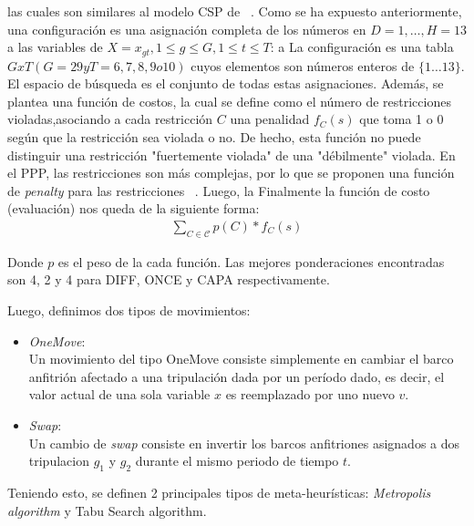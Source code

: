 \documentclass[letter, 10pt]{article}
\begin{document}
las cuales son similares al modelo CSP de ~\cite{Smith1996}. 
Como se ha expuesto anteriormente, una configuración es una asignación completa de los números en $D = {1,\ldots ,H = 13}$ a las variables de $X = {x_{gt}, 1 \leq g \leq G, 1 \leq t \leq T}$: a La configuración es una tabla $G x T (G = 29 y T = 6,7,8,9 o 10)$ cuyos elementos son números enteros de $\{1\ldots 13\}$. El espacio de búsqueda es el conjunto de todas estas asignaciones. Además, se plantea una función de costos, la cual se define como el número de restricciones violadas,asociando a cada restricción $C$ una penalidad $f_C (s)$ que toma 1 o 0 según que la restricción sea violada o no. De hecho, esta función no puede distinguir una restricción "fuertemente violada" de una "débilmente" violada. En el PPP, las restricciones son más complejas, por lo que se proponen una función de \textit{penalty} para las restricciones ~\cite{Galinier1999}. Luego, la Finalmente la función de costo (evaluación) nos queda de la siguiente forma:
\begin{align*}
  \displaystyle \sum_{C \in \mathcal{C}} p(\mathit{C}) * f_{C}(s)
\end{align*}

Donde $p$ es el peso de la cada función. 
Las mejores ponderaciones encontradas son 4, 2 y 4 para DIFF, ONCE y CAPA respectivamente.

Luego, definimos dos tipos de movimientos:
\begin{itemize}
    \item \textit{OneMove}: \\
    Un movimiento del tipo OneMove consiste simplemente en cambiar el barco anfitrión afectado a una tripulación dada por un período dado, es decir, el valor actual de una sola variable $x$ es reemplazado por uno nuevo $v$.
    
    \item \textit{Swap}: \\
    Un cambio de \textit{swap} consiste en invertir los barcos anfitriones asignados a dos tripulacion $g_1$ y $g_2$ durante el mismo periodo de tiempo $t$. 
\end{itemize}

Teniendo esto, se definen 2 principales tipos de meta-heurísticas: \textit{Metropolis algorithm} y {Tabu Search algorithm}. 
\end{document}
